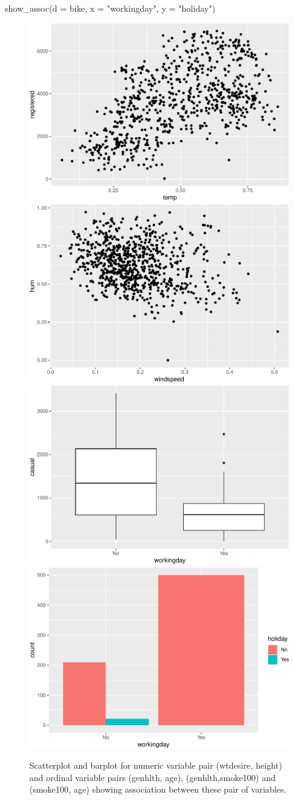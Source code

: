\begin{Schunk}
\begin{Sinput}
show_assoc(d = bike, 
           x = "workingday", 
           y = "holiday")
\end{Sinput}
\begin{figure}
\includegraphics[width=0.5\linewidth]{rj_paper_files/figure-latex/int-pairs-bike-1} \includegraphics[width=0.5\linewidth]{rj_paper_files/figure-latex/int-pairs-bike-2} \includegraphics[width=0.5\linewidth]{rj_paper_files/figure-latex/int-pairs-bike-3} \includegraphics[width=0.5\linewidth]{rj_paper_files/figure-latex/int-pairs-bike-4} \caption[Scatterplot and barplot for numeric variable pair (wtdesire, height) and ordinal variable pairs (genhlth, age), (genhlth,smoke100) and (smoke100, age) showing association between these pair of variables]{Scatterplot and barplot for numeric variable pair (wtdesire, height) and ordinal variable pairs (genhlth, age), (genhlth,smoke100) and (smoke100, age) showing association between these pair of variables.}\label{fig:int-pairs-bike}
\end{figure}
\end{Schunk}

